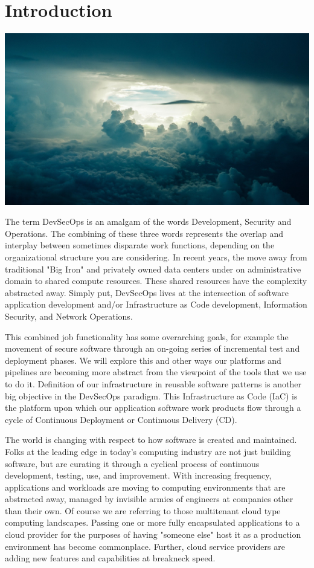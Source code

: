 \chapter{Introduction}
\includegraphics{../images/sky-690293_1920.jpg}

\justify
The term DevSecOps is an amalgam of the words
Development, Security and Operations. The combining of these three words
represents the overlap and interplay between sometimes disparate work
functions, depending on the organizational structure you are considering.
In recent years, the move away from traditional "Big Iron" and privately owned data
centers under on administrative domain to shared compute resources. These shared
resources have the complexity abstracted away.
Simply put, DevSecOps lives at the intersection of
software application development and/or Infrastructure as Code
development, Information Security, and Network Operations. 

\justify
This combined job functionality has some overarching goals, for example the movement of secure
software through an on-going series of incremental test and deployment
phases. We will explore this and other ways our platforms and pipelines
are becoming more abstract from the viewpoint of the tools that we use to do it.
Definition of our infrastructure in reusable software patterns is another big objective 
in the DevSecOps paradigm. This Infrastructure as Code (IaC)
is the platform
upon which our application software work products flow through a cycle of Continuous 
Deployment or Continuous Delivery (CD). 

\justify
The world is changing with respect to how software is created and maintained. 
Folks at the leading edge in today's computing industry are not just building
software, but are curating it through a cyclical process of continuous development,
testing, use, and improvement. With increasing frequency, applications and
workloads are moving to computing environments that are abstracted away, managed
by invisible armies of engineers at companies other than their own. Of course
we are referring to those multitenant cloud type computing landscapes. Passing
one or more fully encapsulated applications to a cloud provider for the purposes
of having "someone else" host it as a production environment has become
commonplace. Further, cloud service providers are adding new features and capabilities 
at breakneck speed.

